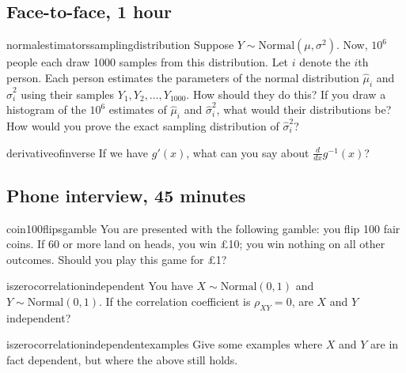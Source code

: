 \documentclass[a4paper]{article}
\begin{document}
\clearpage
\subsection{Face-to-face, 1 hour}
\begin{question}{normalestimatorssamplingdistribution}
Suppose
$Y \sim \text{Normal}(\mu, \sigma^2)$.
Now, $10^6$ people each draw 1000 samples from this distribution.
Let $i$ denote the $i$th person.
Each person estimates the parameters of the normal distribution
$\hat{\mu}_i$
and
$\hat{\sigma}^2_i$
using their samples
$Y_1, Y_2, \ldots , Y_{1000}$.
How should they do this?
If you draw a histogram of the $10^6$ estimates of
$\hat{\mu}_i$ and $\hat{\sigma}^2_i$, what would their distributions be?
How would you prove the exact sampling distribution of $\hat{\sigma}^2_i$?
\end{question}


\begin{question}{derivativeofinverse}
If we have  $g'(x)$,
what can you say about $\frac{d}{dx} g^{-1}(x)$?
\end{question}

\clearpage




\clearpage
\subsection{Phone interview, 45 minutes}
\begin{question}{coin100flipsgamble}
You are presented with the following gamble: you flip 100 fair coins.
If 60 or more land on heads, you win \pounds 10; you win nothing on all other outcomes.
Should you play this game for \pounds 1?
\end{question}

\begin{question}{iszerocorrelationindependent}
You have $X \sim \text{Normal}(0,1)$ and $Y \sim \text{Normal}(0,1)$.
If the correlation coefficient is $\rho_{XY}=0$, are $X$ and $Y$ independent?
\end{question}


\begin{subquestion}{iszerocorrelationindependentexamples}
Give some examples where $X$ and $Y$ are in fact dependent, but where the above still holds.
\end{subquestion}
\end{document}
